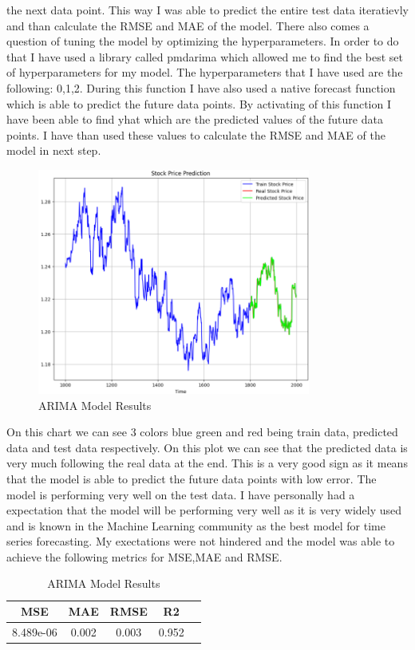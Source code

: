 \documentclass{imc-inf}
\begin{document}
			the next data point. This way I was able to predict the entire test data iteratievly and than calculate the RMSE and MAE of the model. There also comes a question of tuning the
			model by optimizing the hyperparameters. In order to do that I have used a library called pmdarima which allowed me to find the best set of hyperparameters for my model.
			The hyperparameters that I have used are the following: 0,1,2. During this function I have also used a native forecast function which is able to predict the future data points.
			By activating of this function I have been able to find yhat which are the predicted values of the future data points. I have than used these values to calculate the RMSE and MAE
			of the model in next step.
			
			\begin{figure}
				\centering
				\includegraphics[width=0.8\textwidth]{arima_chart.png}
				\caption{ARIMA Model Results}
				\label{fig:arima_model_plots}
			\end{figure}

			On this chart we can see 3 colors blue green and red being train data, predicted data and test data respectively. On this plot we can see that the predicted data is very much following  
			the real data at the end. This is a very good sign as it means that the model is able to predict the future data points with low error. The model is performing very well on the test data. 
			I have personally had a expectation that the model will be performing very well as it is very widely used and is known in the Machine Learning community as the best model for time series forecasting.
			My exectations were not hindered and the model was able to achieve the following metrics for MSE,MAE and RMSE.
			\begin{table}[h!]
				\centering
				\begin{tabular}{|c|c|c|c|c|}
					\hline
					\textbf{MSE} & \textbf{MAE} & \textbf{RMSE}  & \textbf{R2}\\ \hline
					8.489e-06 & 0.002 & 0.003 & 0.952\\ \hline
				\end{tabular}
				\caption{ARIMA Model Results}
				\label{tab:arima_model_results}
			\end{table}
\end{document}

